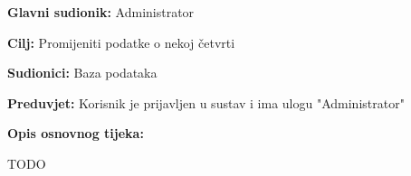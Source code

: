 					\noindent {}
					\begin{packed_item}
	
						\item \textbf{Glavni sudionik: }Administrator
						\item  \textbf{Cilj:} Promijeniti podatke o nekoj četvrti
						\item  \textbf{Sudionici:} Baza podataka
						\item  \textbf{Preduvjet:} Korisnik je prijavljen u sustav i ima ulogu "Administrator"
						\item  \textbf{Opis osnovnog tijeka:}
						
						\item[] \begin{packed_enum}
	
							\item TODO
						\end{packed_enum}
					\end{packed_item}
					
